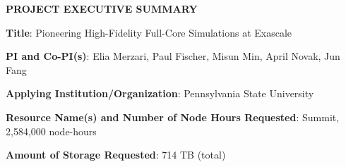 \documentclass[11pt,letterpaper,english]{article}
\begin{document}
\setlength{\parindent}{0in} %

\pagestyle{fancy}   \renewcommand{%
\headrulewidth}{0.0pt}

\begin{center}
\bf {PROJECT EXECUTIVE SUMMARY} \\
\end{center}




\bigskip

\textbf{Title}: Pioneering High-Fidelity Full-Core Simulations at Exascale \smallskip

\textbf{PI and Co-PI(s)}: Elia Merzari, Paul Fischer, Misun Min, April Novak, Jun Fang \smallskip

\textbf{Applying Institution/Organization}: Pennsylvania State University \smallskip

\textbf{Resource Name(s) and Number of Node Hours Requested}: Summit, 2,584,000 node-hours \smallskip

\textbf{Amount of Storage Requested}: 714 TB (total) \smallskip
\end{document}
